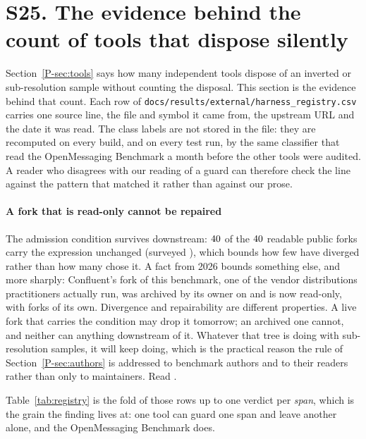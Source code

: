 \documentclass[10pt,journal,onecolumn]{IEEEtran}
\newcommand{\mainTools}{\ref{P-sec:tools}}                %
\newcommand{\mainAuthors}{\ref{P-sec:authors}}        %
\begin{document}
\section{S25. The evidence behind the count of tools that dispose silently}
\label{sec:registry}

Section~\mainTools{} says how many independent tools dispose of an inverted or sub-resolution sample
without counting the disposal. This section is the evidence behind that count. Each row of
\texttt{docs/results/external/harness\_registry.csv} carries one source line, the file and
symbol it came from, the upstream URL and the date it was read. The class labels are not
stored in the file: they are recomputed on every build, and on every test run, by the same
classifier that read the OpenMessaging Benchmark a month before the other tools were
audited. A reader who disagrees with our reading of a guard can therefore check the line
against the pattern that matched it rather than against our prose.
\paragraph{A fork that is read-only cannot be repaired}
The admission condition survives downstream: $40$ of the $40$ readable
public forks carry the expression unchanged (surveyed \forkCheckedOn{}), which bounds how few have
diverged rather than how many chose it. A fact from 2026 bounds something else, and more sharply: Confluent's fork of this benchmark, one of
the vendor distributions practitioners actually run, was archived by its owner on
\forkArchivedOn{} and is now read-only, with \forkArchivedForks{} forks of its own. Divergence
and repairability are different properties. A live fork that carries the condition may drop it
tomorrow; an archived one cannot, and neither can anything downstream of it. Whatever that tree
is doing with sub-resolution samples, it will keep doing, which is the practical reason the rule
of Section~\mainAuthors{} is addressed to benchmark authors and to their readers rather
than only to maintainers. Read \forkArchivedRead{}.

Table~\ref{tab:registry} is the fold of those rows up to one verdict per \emph{span}, which is
the grain the finding lives at: one tool can guard one span and leave another alone, and the
OpenMessaging Benchmark does.
\end{document}
